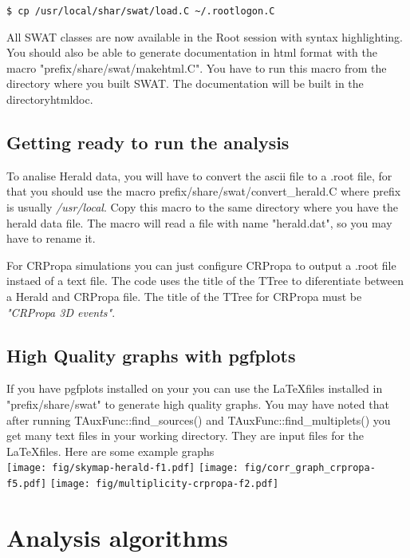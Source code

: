 \documentclass[12pt]{report}
\begin{document}
{ \color{brown}
\begin{lstlisting}
$ cp /usr/local/shar/swat/load.C ~/.rootlogon.C
\end{lstlisting}
}

All SWAT classes are now available in the Root session with syntax
highlighting. You should also be able to generate documentation in html format
with the macro {\color{brown}"prefix/share/swat/makehtml.C"}. You have to run
this macro from the directory where you built SWAT. The documentation will be
built in the directory{\color{brown}htmldoc}.

\section{Getting ready to run the analysis} \label{ch::ready}
To analise Herald data, you will have to convert the ascii file to a .root
file, for that you should use the macro
{\color{brown}prefix/share/swat/convert\_herald.C} where prefix is usually
\textit{/usr/local}.  Copy this macro to the same directory where you have the
herald data file. The macro will read a file with name
{\color{brown}"herald.dat"}, so you may have to rename it. 

For CRPropa simulations you can just configure CRPropa to output a .root file
instaed of a text file.  The code uses the title of the TTree to diferentiate
between a Herald and CRPropa file. The title of the TTree for CRPropa must be
\textit{\color{brown}"CRPropa 3D events"}.

\section{High Quality graphs with pgfplots} \label{ch::pgfplots}
If you have pgfplots installed on your you can use the \LaTeX files installed in 
{\color{brown}"prefix/share/swat"} to generate high quality graphs. You may have noted that 
after running {\color{brown}TAuxFunc::find\_sources()} and {\color{brown}TAuxFunc::find\_multiplets()}
you get many text files in your working directory. They are input files for the \LaTeX files. Here are some 
example graphs \\
\vspace{1cm}
\texttt{[image: fig/skymap-herald-f1.pdf]} \hfill
\texttt{[image: fig/corr\_graph\_crpropa-f5.pdf]} \hfill
\texttt{[image: fig/multiplicity-crpropa-f2.pdf]} \\ 

\chapter{Analysis algorithms}
\end{document}
